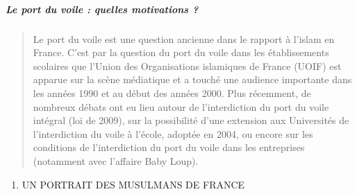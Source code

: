 \hypertarget{le-port-du-voile-quelles-motivations}{%
\subparagraph{Le port du voile : quelles motivations
?}\label{le-port-du-voile-quelles-motivations}}

\begin{quote}
Le port du voile est une question ancienne dans le rapport à l'islam en
France. C'est par la question du port du voile dans les établissements
scolaires que l'Union des Organisations islamiques de France (UOIF) est
apparue sur la scène médiatique et a touché une audience importante dans
les années 1990 et au début des années 2000. Plus récemment, de nombreux
débats ont eu lieu autour de l'interdiction du port du voile intégral
(loi de 2009), sur la possibilité d'une extension aux Universités de
l'interdiction du voile à l'école, adoptée en 2004, ou encore sur les
conditions de l'interdiction du port du voile dans les entreprises
(notamment avec l'affaire Baby Loup).
\end{quote}

\begin{enumerate}
\def\labelenumi{\Roman{enumi}.}
\item
  UN PORTRAIT DES MUSULMANS DE FRANCE
\end{enumerate}

